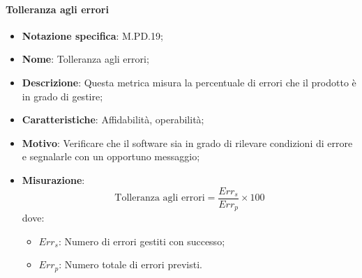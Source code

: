 \paragraph*{Tolleranza agli errori}
\begin{itemize}
    \item \textbf{Notazione specifica}: M.PD.19;
    \item \textbf{Nome}: Tolleranza agli errori;
    \item \textbf{Descrizione}: Questa metrica misura la percentuale di errori che il prodotto è in grado di gestire;
    \item \textbf{Caratteristiche}: Affidabilità, operabilità;
    \item \textbf{Motivo}: Verificare che il software sia in grado di rilevare condizioni di errore e segnalarle con un opportuno messaggio;
    \item \textbf{Misurazione}:
    \[
        \text{Tolleranza agli errori} = \frac{Err_{s}}{Err_{p}} \times 100
    \]
    dove:
    \begin{itemize}
        \item $Err_{s}$: Numero di errori gestiti con successo;
        \item $Err_{p}$: Numero totale di errori previsti.
    \end{itemize}
\end{itemize}
